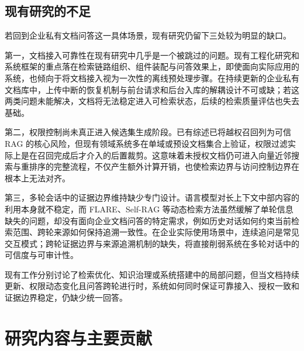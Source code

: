 \subsection{现有研究的不足}

若回到企业私有文档问答这一具体场景，现有研究仍留下三处较为明显的缺口。

第一，文档接入可靠性在现有研究中几乎是一个被跳过的问题。现有工程化研究和系统框架的重点落在检索链路组织、组件装配与问答效果上\cite{zhang2025flexrag,vogelsang2025ragva,wang2025buildingkm,rubio2025industrialkm}，即使面向实际应用的系统，也倾向于将文档接入视为一次性的离线预处理步骤。在持续更新的企业私有文档库中，上传中断的恢复机制与前台请求和后台入库的解耦设计不可或缺；若这两类问题未能解决，文档将无法稳定进入可检索状态，后续的检索质量评估也失去基础。

第二，权限控制尚未真正进入候选集生成阶段。已有综述已将越权召回列为可信 RAG 的核心风险\cite{ni2025trustworthyrag}，但现有领域系统多在单域或预设文档集合上验证\cite{wang2025buildingkm,rubio2025industrialkm,policyrag2025}，权限过滤实际上是在召回完成后才介入的后置裁剪。这意味着未授权文档仍可进入向量近邻搜索与重排序的完整流程，不仅产生额外计算开销，也使检索边界与访问控制边界在根本上无法对齐。

第三，多轮会话中的证据边界维持缺少专门设计。语言模型对长上下文中部内容的利用本身就不稳定\cite{liu2024lostmiddle}，而 FLARE、Self-RAG 等动态检索方法虽然缓解了单轮信息缺失的问题\cite{jiang2023flare,asai2024selfrag}，却没有面向企业文档问答的特定需求，例如历史对话如何约束当前检索范围、跨轮来源如何保持追溯一致性。在企业实际使用场景中，连续追问是常见交互模式；跨轮证据边界与来源追溯机制的缺失，将直接削弱系统在多轮对话中的可信度与可审计性。

现有工作分别讨论了检索优化、知识治理或系统搭建中的局部问题，但当文档持续更新、权限动态变化且问答跨轮进行时，系统如何同时保证可靠接入、授权一致和证据边界稳定，仍缺少统一回答。

\section{研究内容与主要贡献}
\label{sec:research_content}

